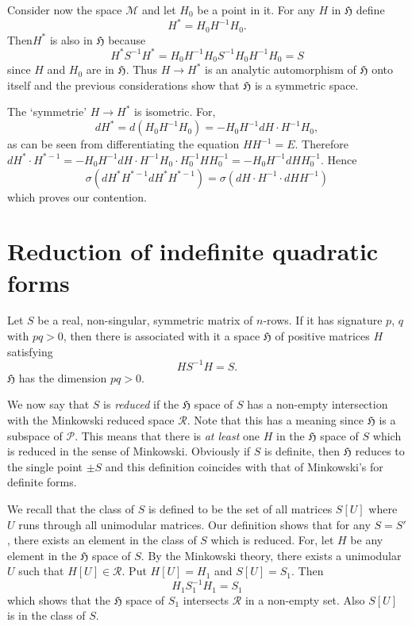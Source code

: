 Consider now the space $\mathscr{M}$ and let $H_{0}$ be a point in
it. For any $H$ in $\mathfrak{H}$ define
$$
H^{\ast}=H_{0}H^{-1}H_{0}.
$$
Then\pageoriginale $H^{\ast}$ is also in $\mathfrak{H}$ because
$$
H^{\ast}S^{-1}H^{\ast}=H_{0}H^{-1}H_{0}S^{-1}H_{0}H^{-1}H_{0}=S
$$
since $H$ and $H_{0}$ are in $\mathfrak{H}$. Thus $H\to H^{\ast}$ is
an analytic automorphism of $\mathfrak{H}$ onto itself and the
previous considerations show that $\mathfrak{H}$ is a symmetric space.

The `symmetrie' $H\to H^{\ast}$ is isometric. For,
$$
dH^{\ast}=d(H_{0}H^{-1}H_{0})=-H_{0}H^{-1}dH\cdot H^{-1}H_{0},
$$
as can be seen from differentiating the equation $HH^{-1}=E$.
Therefore $dH^{\ast}\cdot H^{\ast-1}=-H_{0}H^{-1}dH\cdot
H^{-1}H_{0}\cdot
H^{-1}_{0}HH^{-1}_{0}=-H_{0}H^{-1}dHH^{-1}_{0}$. Hence
$$
\sigma(dH^{\ast}H^{\ast-1}dH^{\ast}H^{\ast-1})=\sigma(dH\cdot
H^{-1}\cdot dHH^{-1})
$$
which proves our contention.

\section{Reduction of indefinite quadratic forms}\label{chap3:sec4}

Let $S$ be a real, non-singular, symmetric matrix of $n$-rows. If it
has signature $p$, $q$ with $pq>0$, then there is associated with it a
space $\mathfrak{H}$ of positive matrices $H$ satisfying
$$
HS^{-1}H=S.
$$
$\mathfrak{H}$ has the dimension $pq>0$.

We now say that $S$ is {\em reduced} if the $\mathfrak{H}$ space of
$S$ has a non-empty intersection with the Minkowski reduced space
$\mathscr{R}$. Note that this has a meaning since $\mathfrak{H}$ is a
subspace of $\mathscr{P}$. This means that there is {\em at least} one
$H$ in the $\mathfrak{H}$ space of $S$ which is reduced in the sense
of Minkowski. Obviously if $S$ is definite, then\pageoriginale
$\mathfrak{H}$ reduces to the single point $\pm S$ and this definition
coincides with that of Minkowski's for definite forms.

We recall that the class of $S$ is defined to be the set of all
matrices $S[U]$ where $U$ runs through all unimodular matrices. Our
definition shows that for any $S=S'$, there exists an element in the
class of $S$ which is reduced. For, let $H$ be any element in the
$\mathfrak{H}$ space of $S$. By the Minkowski theory, there exists a
unimodular $U$ such that $H[U]\in\mathscr{R}$. Put $H[U]=H_{1}$ and
$S[U]=S_{1}$. Then
$$
H_{1}S^{-1}_{1}H_{1}=S_{1}
$$
which shows that the $\mathfrak{H}$ space of $S_{1}$ intersects
$\mathscr{R}$ in a non-empty set. Also $S[U]$ is in the class of $S$.

